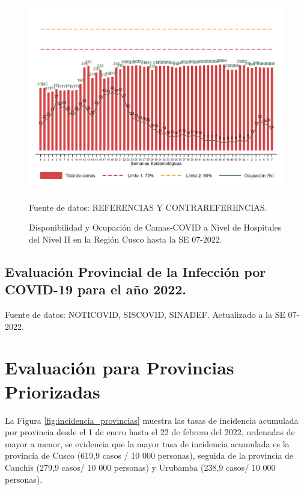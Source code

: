 \documentclass[12pt,a4paper,openany]{book}
\begin{document}
\begin{figure}[h]
	\caption{Disponibilidad y Ocupación de Camas-COVID a Nivel de Hospitales del Nivel II en la Región Cusco hasta la SE 07-2022.}\label{fig:ocupacion_2nivel}
	\begin{center}
		\includegraphics[width=0.95\linewidth]{../figuras/nivel_2.png}
	\end{center}
	{\footnotesize {Fuente de datos: REFERENCIAS Y CONTRAREFERENCIAS.}}
\end{figure}
\clearpage
\begin{landscape}
	
	\subsection*{Evaluación Provincial de la Infección por COVID-19 para el año 2022.} 
	
	
	
	
	{\footnotesize Fuente de datos: NOTICOVID, SISCOVID, SINADEF. Actualizado a la SE 07-2022.}
	
	\noindent 
	
\end{landscape}


\clearpage

	\section*{Evaluación para Provincias Priorizadas}
\noindent La Figura \ref{fig:incidencia_provincias} muestra las tasas de incidencia acumulada por provincia desde el 1 de enero hasta el 22 de febrero del 2022, ordenadas de mayor a menor, se evidencia que la mayor tasa de incidencia acumulada es la provincia de Cusco (619,9 casos / 10 000 personas), seguida de la provincia de Canchis (279,9 casos/ 10 000 personas)  y Urubamba (238,9 casos/ 10 000 personas).
\end{document}
